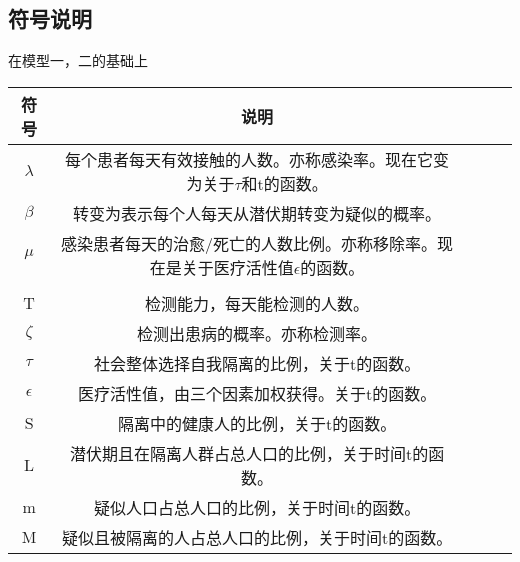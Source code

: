 \documentclass[withoutpreface,bwprint]{cumcmthesis} %
\begin{document}
\subsection{符号说明}
在模型一，二的基础上
    \begin{table}[!htbp]
       \label{tab:002}
       \centering
        \begin{tabular}{ccccc}
            \toprule[1.5pt]
            符号 & 说明 \\
            \midrule[1pt]
             $\lambda $ & 每个患者每天有效接触的人数。亦称感染率。现在它变为关于$\tau $和t的函数。\\
             $\beta $ & 转变为表示每个人每天从潜伏期转变为疑似的概率。\\
             $\mu $ & 感染患者每天的治愈/死亡的人数比例。亦称移除率。现在是关于医疗活性值$\epsilon $的函数。\\
             \\
             T & 检测能力，每天能检测的人数。\\
             $\zeta $& 检测出患病的概率。亦称检测率。\\
             $\tau $ & 社会整体选择自我隔离的比例，关于t的函数。\\
             $\epsilon $ & 医疗活性值，由三个因素加权获得。关于t的函数。\\
             S & 隔离中的健康人的比例，关于t的函数。\\
             L & 潜伏期且在隔离人群占总人口的比例，关于时间t的函数。\\
             m & 疑似人口占总人口的比例，关于时间t的函数。\\
             M & 疑似且被隔离的人占总人口的比例，关于时间t的函数。\\

            \bottomrule[1.5pt]
        \end{tabular}
    \end{table}
\end{document}
